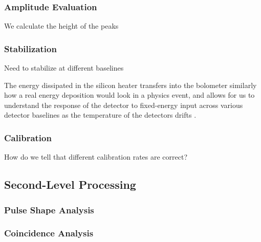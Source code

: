 \subsubsection*{Amplitude Evaluation}
We calculate the height of the peaks
\subsubsection*{Stabilization}
Need to stabilize at different baselines
\label{ssec:Stabilization}

The energy dissipated in the silicon heater transfers into the bolometer similarly how a real energy deposition would look in a physics event, and allows for us to understand the response of the detector to fixed-energy input across various detector baselines as the temperature of the detectors drifts \cite{ALESSANDRELLO1998454:Si-heater}.

\subsubsection{Calibration}
How do we tell that different calibration rates are correct?
\label{ssec:Calibration}
\subsection{Second-Level Processing}
\subsubsection{Pulse Shape Analysis}
\subsubsection{Coincidence Analysis}



